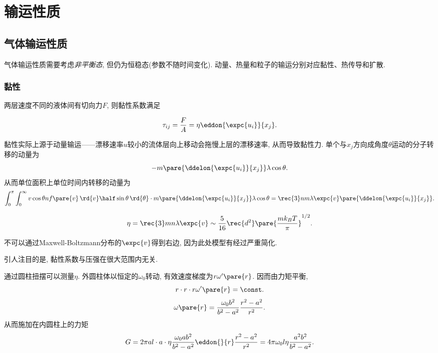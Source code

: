 \documentclass[../Thermal.tex]{subfiles}
\begin{document}
\section{输运性质}
\subsection{气体输运性质}
气体输运性质需要考虑\emph{非平衡态}, 但仍为恒稳态(参数不随时间变化). 动量、热量和粒子的输运分别对应黏性、热传导和扩散.
\subsubsection{黏性}
\begin{definition}[黏性系数]
两层速度不同的液体间有切向力$F$, 则黏性系数满足
\begin{finale}
\[ \tau_{ij} = \frac{F}{A} = \eta\eddon{\expc{u_i}}{x_j}. \]
\end{finale}
\end{definition}
黏性实际上源于动量输运——漂移速率$u$较小的流体层向上移动会拖慢上层的漂移速率, 从而导致黏性力. 单个与$x_j$方向成角度$\theta$运动的分子转移的动量为
\[ -m\pare{\ddelon{\expc{u_i}}{x_j}}\lambda\cos\theta. \]
从而单位面积上单位时间内转移的动量为
\[ \int_0^{\pi}\int_0^\infty v\cos\theta nf\pare{v} \,\rd{v}\half\sin\theta\,\rd{\theta}\cdot m{\pare{\ddelon{\expc{u_i}}{x_j}}\lambda\cos\theta} = \rec{3}nm\lambda\expc{v}\pare{\ddelon{\expc{u_i}}{x_j}}. \]
\begin{finale}
\[ \eta = \rec{3}mn\lambda\expc{v} \sim \frac{5}{16} \rec{d^2} \pare{\frac{mk_BT}{\pi}}^{1/2}. \]
\end{finale}
\begin{pitfall}
不可以通过Maxwell-Boltzmann分布的$\expc{v}$得到右边, 因为此处模型有经过严重简化.
\end{pitfall}
引人注目的是, 黏性系数与压强在很大范围内无关.
\begin{ex}
通过圆柱扭摆可以测量$\eta$. 外圆柱体以恒定的$\omega_0$转动, 有效速度梯度为$r\omega'\pare{r}$. 因而由力矩平衡,
\[ r\cdot r\cdot r\omega'\pare{r} = \const. \]
\[ \omega\pare{r} = \frac{\omega_0 b^2}{b^2-a^2}\frac{r^2-a^2}{r^2}. \]
从而施加在内圆柱上的力矩
\[ G = 2\pi a l \cdot a \cdot \eta\frac{\omega_0 ab^2}{b^2-a^2}\eddon{}{r}\frac{r^2-a^2}{r^2} = 4\pi \omega_0l\eta\frac{a^2b^2}{b^2-a^2}. \]
\end{ex}
\end{document}
